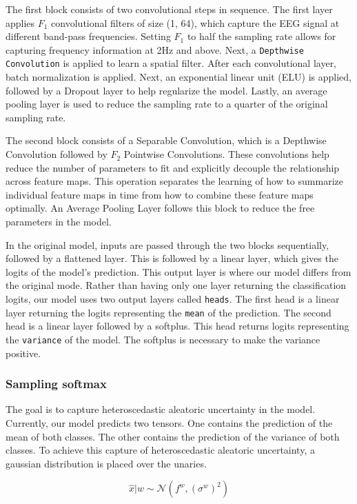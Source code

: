 The first block consists of two convolutional steps in sequence. The first layer applies $F_1$ convolutional filters of size (1, 64), which capture the EEG signal at different band-pass frequencies. Setting $F_1$ to half the sampling rate allows for capturing frequency information at 2Hz and above. Next, a \verb|Depthwise Convolution| is applied to learn a spatial filter. After each convolutional layer, batch normalization is applied. Next, an exponential linear unit (ELU) is applied, followed by a Dropout layer to help regularize the model. Lastly, an average pooling layer is used to reduce the sampling rate to a quarter of the original sampling rate.

The second block consists of a Separable Convolution, which is a Depthwise Convolution followed by $F_2$ Pointwise Convolutions. These convolutions help reduce the number of parameters to fit and explicitly decouple the relationship across feature maps. This operation separates the learning of how to summarize individual feature maps in time from how to combine these feature maps optimally. An Average Pooling Layer follows this block to reduce the free parameters in the model.

In the original model, inputs are passed through the two blocks sequentially, followed by a flattened layer. This is followed by a linear layer, which gives the logits of the model's prediction. This output layer is where our model differs from the original mode. Rather than having only one layer returning the classification logits, our model uses two output layers called \verb|heads|. The first head is a linear layer returning the logits representing the \verb|mean| of the prediction. The second head is a linear layer followed by a softplus. This head returns logits representing the \verb|variance| of the model. The softplus is necessary to make the variance positive.


\subsubsection{Sampling softmax}

The goal is to capture heteroscedastic aleatoric uncertainty in the model. Currently, our model predicts two tensors. One contains the prediction of the mean of both classes. The other contains the prediction of the variance of both classes. To achieve this capture of heteroscedastic aleatoric uncertainty, a gaussian distribution is placed over the unaries.

\begin{equation}
    \hat{x}|w \sim \mathcal{N}(f^w, (\sigma^w)^2)
\end{equation}

